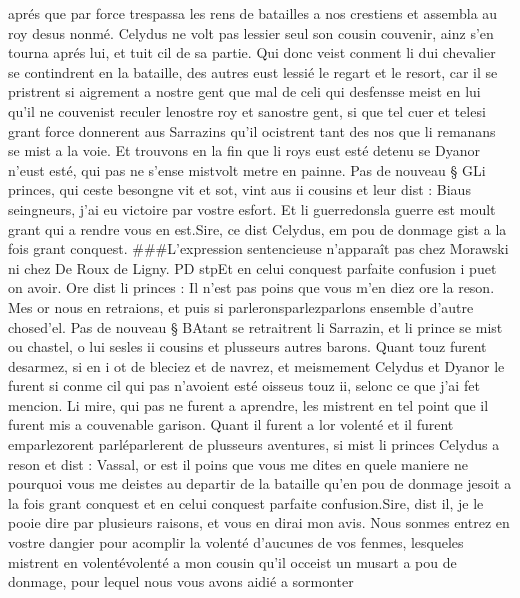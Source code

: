 \documentclass{article}
\begin{document}
\begin{pages}
   aprés que par force trespassa les rens de batailles a nos crestiens et assembla au 
   roy desus nonmé. Celydus ne volt pas lessier seul 
   son cousin couvenir, ainz s’en tourna 
   aprés lui, et tuit cil de sa partie. 
   Qui donc veist conment li dui chevalier se contindrent en la bataille, des autres 
   eust lessié le regart et le resort, car il se pristrent si aigrement
   a nostre gent que mal de celi qui desfensse meist en lui qu’il ne couvenist reculer 
   lenostre roy et 
   sanostre gent, si que tel cuer et 
   telesi grant force donnerent aus Sarrazins 
   qu’il ocistrent tant des nos que li remanans se mist a la voie. 
   Et trouvons en la fin que li roys eust esté detenu 
   se Dyanor n’eust esté, qui pas ne s’ense 
   mistvolt metre en painne. \pend
\pstart Pas de nouveau § GLi princes, 
   qui ceste besongne vit et sot, vint aus ii cousins et leur dist :
   Biaus seingneurs, j’ai eu victoire par vostre esfort. 
      Et li guerredonsla guerre est moult grant qui a rendre vous en est.Sire, ce dist 
      Celydus, em pou de donmage gist a la fois grant conquest. 
      ###L'expression sentencieuse n'apparaît pas chez Morawski ni chez De Roux de Ligny. PD stpEt en celui 
      conquest parfaite confusion i puet 
      on avoir.
   Ore dist li princes :
   Il n’est pas poins que vous m’en diez ore la reson. Mes or nous en retraions, et puis si 
      parleronsparlezparlons 
      ensemble d’autre chosed'el. \pend 
\pstart Pas de nouveau § BAtant se retraitrent li 
   Sarrazin, 
   et li prince se mist ou chastel, o lui 
   sesles ii cousins et plusseurs autres barons. 
   Quant touz furent desarmez, si en i ot de bleciez et de navrez, et meismement Celydus et 
   Dyanor le furent si conme cil qui pas n’avoient esté oisseus 
   touz ii, selonc ce que j’ai fet mencion. 
   Li mire, qui pas ne furent a aprendre, les mistrent en tel point que il furent 
   mis a couvenable garison. Quant il furent a lor volenté et il 
   furent emparlezorent parléparlerent 
   de plusseurs aventures, si mist li princes 
   Celydus a reson et dist :
   Vassal, or est il poins que vous me dites en quele maniere ne pourquoi vous me deistes au departir 
      de la bataille qu’en pou de donmage jesoit a la fois grant conquest et en celui conquest parfaite confusion.Sire, dist il, je le pooie dire par plusieurs raisons, et vous en dirai mon avis. 
      Nous sonmes entrez en vostre dangier pour acomplir la volenté d’aucunes 
      de vos fenmes, lesqueles mistrent en volentévolenté a mon cousin 
      qu’il occeist un musart a pou de donmage, pour lequel nous vous avons aidié a sormonter 

\end{pages}
\end{document}
